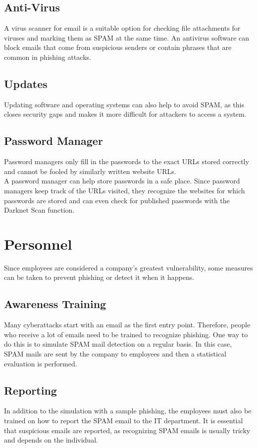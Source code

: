 \subsection{Anti-Virus}
A virus scanner for email is a suitable option for checking file attachments for viruses and marking them as SPAM at the same time. An antivirus software can block emails that come from suspicious senders or contain phrases that are common in phishing attacks.

\subsection{Updates}
Updating software and operating systems can also help to avoid SPAM, as this closes security gaps and makes it more difficult for attackers to access a system.

\subsection{Password Manager}
Password managers only fill in the passwords to the exact URLs stored correctly and cannot be fooled by similarly written website URLs. \\ 
A password manager can help store passwords in a safe place. Since password managers keep track of the URLs visited, they recognize the websites for which passwords are stored and can even check for published passwords with the Darknet Scan function.

\section{Personnel}
Since employees are considered a company's greatest vulnerability, some measures can be taken to prevent phishing or detect it when it happens.

\subsection{Awareness Training}
Many cyberattacks start with an email as the first entry point.
Therefore, people who receive a lot of emails need to be trained to recognize phishing.
One way to do this is to simulate SPAM mail detection on a regular basis.
In this case, SPAM mails are sent by the company to employees and then a statistical evaluation is performed.

\subsection{Reporting}
In addition to the simulation with a sample phishing, the employees must also be trained on how to report the SPAM email to the IT department.
It is essential that suspicious emails are reported, as recognizing SPAM emails is usually tricky and depends on the individual.


